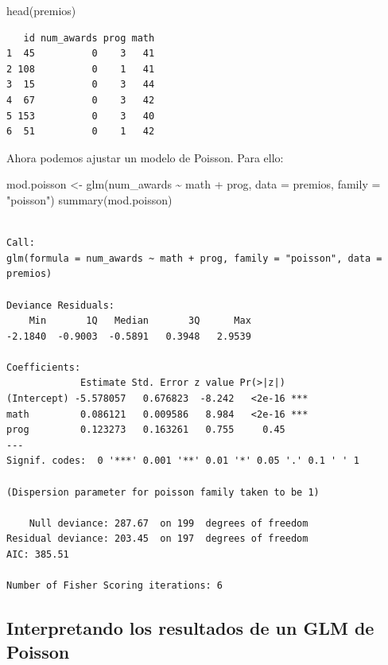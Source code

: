 \documentclass[
  letterpaper,
  DIV=11,
  numbers=noendperiod]{scrreprt}
\newenvironment{Shaded}{\begin{snugshade}}{\end{snugshade}}
\newcommand{\AttributeTok}[1]{\textcolor[rgb]{0.40,0.45,0.13}{#1}}
\newcommand{\FunctionTok}[1]{\textcolor[rgb]{0.28,0.35,0.67}{#1}}
\newcommand{\NormalTok}[1]{\textcolor[rgb]{0.00,0.23,0.31}{#1}}
\newcommand{\OtherTok}[1]{\textcolor[rgb]{0.00,0.23,0.31}{#1}}
\newcommand{\SpecialCharTok}[1]{\textcolor[rgb]{0.37,0.37,0.37}{#1}}
\newcommand{\StringTok}[1]{\textcolor[rgb]{0.13,0.47,0.30}{#1}}
\begin{document}
\begin{Shaded}
\begin{Highlighting}[]
\FunctionTok{head}\NormalTok{(premios)}
\end{Highlighting}
\end{Shaded}

\begin{verbatim}
   id num_awards prog math
1  45          0    3   41
2 108          0    1   41
3  15          0    3   44
4  67          0    3   42
5 153          0    3   40
6  51          0    1   42
\end{verbatim}

Ahora podemos ajustar un modelo de Poisson. Para ello:

\begin{Shaded}
\begin{Highlighting}[]
\NormalTok{mod.poisson }\OtherTok{\textless{}{-}} \FunctionTok{glm}\NormalTok{(num\_awards }\SpecialCharTok{\textasciitilde{}}\NormalTok{ math }\SpecialCharTok{+}\NormalTok{ prog,  }\AttributeTok{data =}\NormalTok{ premios, }\AttributeTok{family =} \StringTok{"poisson"}\NormalTok{)}
\FunctionTok{summary}\NormalTok{(mod.poisson)}
\end{Highlighting}
\end{Shaded}

\begin{verbatim}

Call:
glm(formula = num_awards ~ math + prog, family = "poisson", data = premios)

Deviance Residuals: 
    Min       1Q   Median       3Q      Max  
-2.1840  -0.9003  -0.5891   0.3948   2.9539  

Coefficients:
             Estimate Std. Error z value Pr(>|z|)    
(Intercept) -5.578057   0.676823  -8.242   <2e-16 ***
math         0.086121   0.009586   8.984   <2e-16 ***
prog         0.123273   0.163261   0.755     0.45    
---
Signif. codes:  0 '***' 0.001 '**' 0.01 '*' 0.05 '.' 0.1 ' ' 1

(Dispersion parameter for poisson family taken to be 1)

    Null deviance: 287.67  on 199  degrees of freedom
Residual deviance: 203.45  on 197  degrees of freedom
AIC: 385.51

Number of Fisher Scoring iterations: 6
\end{verbatim}

\hypertarget{interpretando-los-resultados-de-un-glm-de-poisson}{%
\subsection{Interpretando los resultados de un GLM de
Poisson}\label{interpretando-los-resultados-de-un-glm-de-poisson}}
\end{document}
